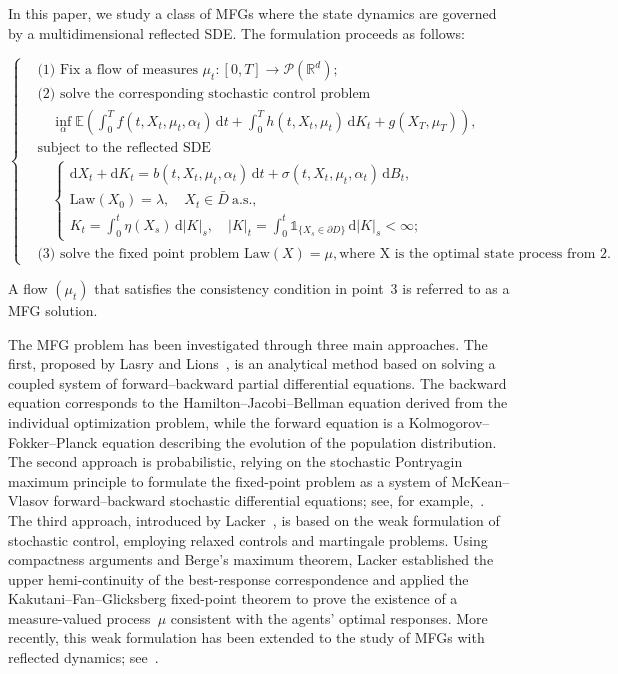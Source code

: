 \documentclass[11pt,amsfonts]{article}
\theoremstyle{plain}
\theoremstyle{assumpstyle}
\numberwithin{equation}{section}
\numberwithin{theorem}{section}
\numberwithin{proposition}{section}
\numberwithin{definition}{section}
\numberwithin{remark}{section}
\numberwithin{corollary}{section}
\numberwithin{lemma}{section}
\begin{document}
In this paper, we study a class of MFGs where the state dynamics are governed by a multidimensional reflected SDE. The formulation proceeds as follows:

\begin{equation} \label{R_MFG_dis}
\left\{
\begin{aligned}
&\text{(1) Fix a flow of measures } 
\mu_t: [0, T] \to \mathcal{P}(\mathbb{R}^d) ;\ \\[1ex]
&\text{(2) solve the corresponding stochastic control problem} \\[1ex]
&\quad 
\inf_{\alpha} \mathbb{E} \left(
    \int_0^T f(t, X_t, \mu_t, \alpha_t)\, \mathrm{d}t
    + \int_0^T h(t, X_t, \mu_t)\, \mathrm{d}K_t
    + g(X_T, \mu_T)
\right), \\[1ex]
&\text{subject to the reflected SDE} \\[1ex]
&\quad
\begin{cases}
\mathrm{d}X_t+ \mathrm{d}K_t = b(t, X_t, \mu_t, \alpha_t)\, \mathrm{d}t
+ \sigma(t, X_t, \mu_t, \alpha_t)\, \mathrm{d}B_t
, \\[0.5ex]
\text{Law}(X_0) = \lambda, \quad X_t \in \bar{D}\ \text{a.s.}, \\[0.5ex]
K_t = \displaystyle\int_0^t \eta(X_s)\, \mathrm{d}|K|_s, \quad
|K|_t = \displaystyle\int_0^t \mathbb{1}_{\{X_s \in \partial D\}}\, \mathrm{d}|K|_s < \infty;
\end{cases} \\[2ex]
&\text{(3) solve the fixed point problem }  
\text{Law}(X) = \mu, \text{where X is the optimal state process from 2}.
\end{aligned}
\right.
\end{equation}


A flow $(\mu_t)$ that satisfies the consistency condition in point~3 is referred to as a MFG solution.

The MFG problem has been investigated through three main approaches. The first, proposed by Lasry and Lions~\cite{LasryP}, is an analytical method based on solving a coupled system of forward--backward partial differential equations. The backward equation corresponds to the Hamilton--Jacobi--Bellman equation derived from the individual optimization problem, while the forward equation is a Kolmogorov--Fokker--Planck equation describing the evolution of the population distribution. The second approach is probabilistic, relying on the stochastic Pontryagin maximum principle to formulate the fixed-point problem as a system of McKean--Vlasov forward--backward stochastic differential equations; see, for example,~\cite{probaappr1, probaappr2, delanaly}. The third approach, introduced by Lacker~\cite{laker}, is based on the weak formulation of stochastic control, employing relaxed controls and martingale problems. Using compactness arguments and Berge’s maximum theorem, Lacker established the upper hemi-continuity of the best-response correspondence and applied the Kakutani--Fan--Glicksberg fixed-point theorem to prove the existence of a measure-valued process~$\mu$ consistent with the agents’ optimal responses. More recently, this weak formulation has been extended to the study of MFGs with reflected dynamics; see~\cite{MFG_R_1, MFG_R_j, badr}.
\end{document}
